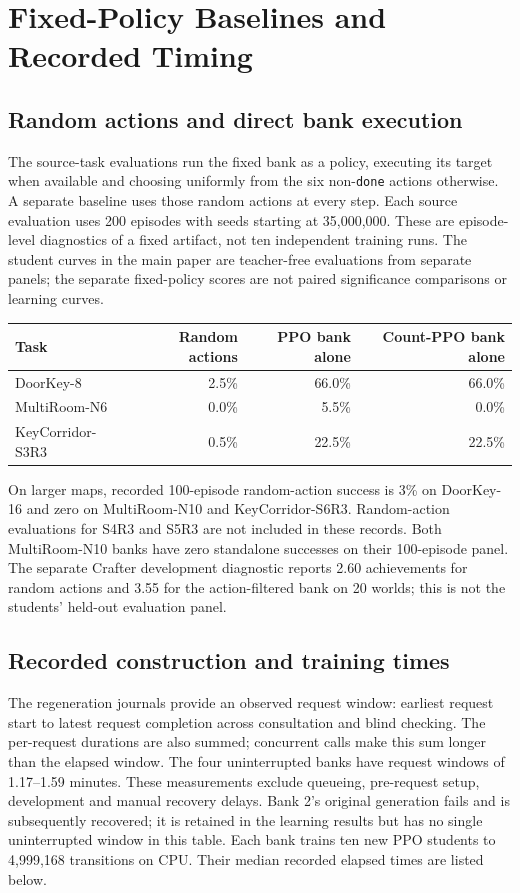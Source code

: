 \section{Fixed-Policy Baselines and Recorded Timing}
\label{app:baselines_timing}
\subsection{Random actions and direct bank execution}
The source-task evaluations run the fixed bank as a policy, executing its
target when available and choosing uniformly from the six non-\texttt{done}
actions otherwise. A separate baseline uses those random actions at every
step. Each source evaluation uses 200 episodes with seeds starting at
35,000,000. These are episode-level diagnostics of a fixed artifact, not
ten independent training runs. The student curves in the main paper are
teacher-free evaluations from separate panels; the separate fixed-policy scores
are not paired significance comparisons or learning curves.
\begin{center}\small
\begin{tabular}{@{}lrrr@{}}\toprule
Task & Random actions & PPO bank alone & Count-PPO bank alone\\\midrule
DoorKey-8 & 2.5\% & 66.0\% & 66.0\%\\
MultiRoom-N6 & 0.0\% & 5.5\% & 0.0\%\\
KeyCorridor-S3R3 & 0.5\% & 22.5\% & 22.5\%\\\bottomrule
\end{tabular}\end{center}
On larger maps, recorded 100-episode random-action success is 3\% on
DoorKey-16 and zero on MultiRoom-N10 and KeyCorridor-S6R3. Random-action
evaluations for S4R3 and S5R3 are not included in these records. Both
MultiRoom-N10 banks have zero standalone successes on their 100-episode
panel. The separate Crafter development diagnostic reports 2.60
achievements for random actions and 3.55 for the action-filtered bank on
20 worlds; this is not the students' held-out evaluation panel.

\subsection{Recorded construction and training times}
The regeneration journals provide an observed request window: earliest
request start to latest request completion across consultation and blind
checking. The per-request durations are also summed; concurrent calls
make this sum longer than the elapsed window. The four uninterrupted banks
have request windows of 1.17--1.59 minutes. These measurements exclude
queueing, pre-request setup, development and manual recovery delays.
Bank 2's original generation fails and is subsequently recovered; it is
retained in the learning results but has no single uninterrupted window
in this table. Each bank trains ten new PPO students to 4,999,168
transitions on CPU. Their median recorded elapsed times are listed below.

